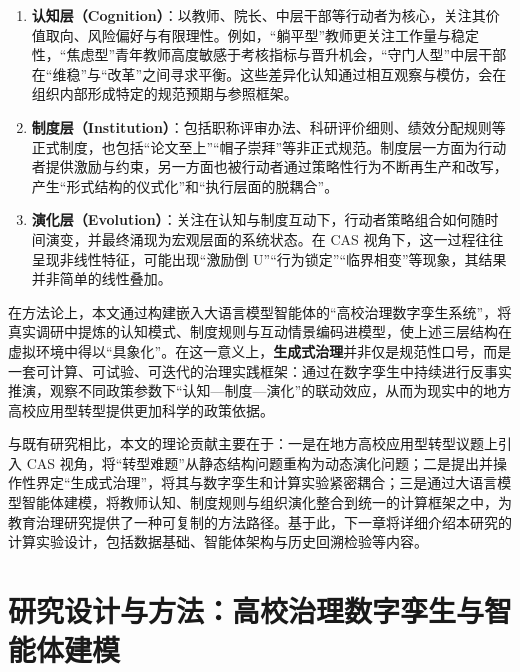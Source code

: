 \documentclass[UTF8, zihao=-4, fontset=mac]{ctexart}
\begin{document}
\begin{enumerate}
    \item \textbf{认知层（Cognition）}：以教师、院长、中层干部等行动者为核心，关注其价值取向、风险偏好与有限理性\cite{simon1996sciences}。例如，“躺平型”教师更关注工作量与稳定性，“焦虑型”青年教师高度敏感于考核指标与晋升机会，“守门人型”中层干部在“维稳”与“改革”之间寻求平衡。这些差异化认知通过相互观察与模仿，会在组织内部形成特定的规范预期与参照框架。
    \item \textbf{制度层（Institution）}：包括职称评审办法、科研评价细则、绩效分配规则等正式制度，也包括“论文至上”“帽子崇拜”等非正式规范\cite{weber1978economy, meyer1977institutionalized}。制度层一方面为行动者提供激励与约束，另一方面也被行动者通过策略性行为不断再生产和改写，产生“形式结构的仪式化”和“执行层面的脱耦合”。
    \item \textbf{演化层（Evolution）}：关注在认知与制度互动下，行动者策略组合如何随时间演变，并最终涌现为宏观层面的系统状态\cite{holland1995hidden, miller2007complex}。在 CAS 视角下，这一过程往往呈现非线性特征，可能出现“激励倒 U”“行为锁定”“临界相变”等现象，其结果并非简单的线性叠加。
\end{enumerate}

在方法论上，本文通过构建嵌入大语言模型智能体的“高校治理数字孪生系统”，将真实调研中提炼的认知模式、制度规则与互动情景编码进模型，使上述三层结构在虚拟环境中得以“具象化”。在这一意义上，\textbf{生成式治理}并非仅是规范性口号，而是一套可计算、可试验、可迭代的治理实践框架：通过在数字孪生中持续进行反事实推演，观察不同政策参数下“认知—制度—演化”的联动效应，从而为现实中的地方高校应用型转型提供更加科学的政策依据。

与既有研究相比，本文的理论贡献主要在于：一是在地方高校应用型转型议题上引入 CAS 视角，将“转型难题”从静态结构问题重构为动态演化问题；二是提出并操作性界定“生成式治理”，将其与数字孪生和计算实验紧密耦合；三是通过大语言模型智能体建模，将教师认知、制度规则与组织演化整合到统一的计算框架之中，为教育治理研究提供了一种可复制的方法路径。基于此，下一章将详细介绍本研究的计算实验设计，包括数据基础、智能体架构与历史回溯检验等内容。



\section{研究设计与方法：高校治理数字孪生与智能体建模}
\end{document}
